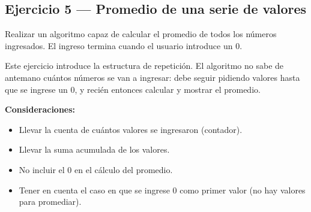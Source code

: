 \subsection{Ejercicio 5 --- Promedio de una serie de valores}

Realizar un algoritmo capaz de calcular el promedio de todos los números ingresados. El ingreso termina cuando el usuario introduce un 0.

\begin{advertenciabox}
Este ejercicio introduce la estructura de repetición. El algoritmo no sabe de antemano cuántos números se van a ingresar: debe seguir pidiendo valores hasta que se ingrese un 0, y recién entonces calcular y mostrar el promedio.
\end{advertenciabox}

\textbf{Consideraciones:}
\begin{itemize}
    \item Llevar la cuenta de cuántos valores se ingresaron (contador).
    \item Llevar la suma acumulada de los valores.
    \item No incluir el 0 en el cálculo del promedio.
    \item Tener en cuenta el caso en que se ingrese 0 como primer valor (no hay valores para promediar).
\end{itemize}
